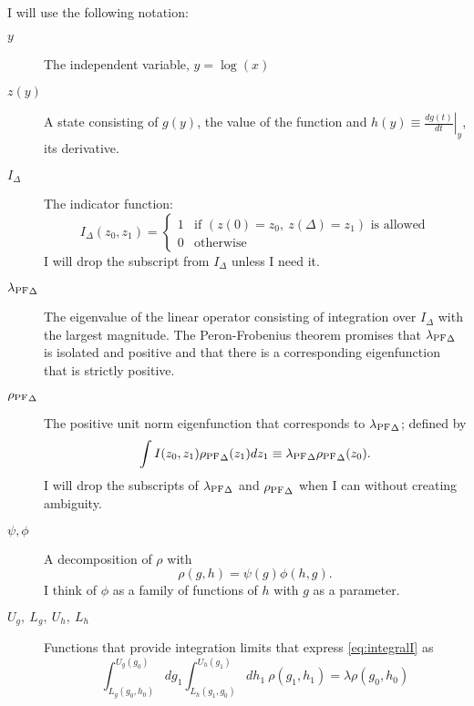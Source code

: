 \documentclass[]{article}
\newcommand\lambdaPF{\lambda_{\rm{PF}}} %
\newcommand\rhoPF{\rho_{\rm{PF}}} %
\begin{document}
I will use the following notation:
\begin{description}
\item[$y$] The independent variable, $y = \log(x)$
\item[$z(y)$] A state consisting of $g(y)$, the value of the function
  and $h(y) \equiv \left. \frac{d g(t)}{d t} \right|_y$, its derivative.
\item[$I_\Delta$] The indicator function:
  \begin{equation}
    \label{eq:indicator}
    I_\Delta(z_0, z_1) =
    \begin{cases}
      1 & \text{if } \left( z(0) = z_0,~z(\Delta)=z_1
      \right) \text{ is allowed} \\
      0 & \text{otherwise}
    \end{cases}
  \end{equation}
  I will drop the subscript from $I_\Delta$ unless I need it.
\item[${\lambdaPF}_\Delta$] The eigenvalue of the linear operator
  consisting of integration over $I_\Delta$ with the largest
  magnitude.  The Peron-Frobenius theorem promises that
  ${\lambdaPF}_\Delta$ is isolated and positive and that there is a
  corresponding eigenfunction that is strictly positive.
\item[${\rhoPF}_\Delta$] The positive unit norm eigenfunction that
  corresponds to ${\lambdaPF}_\Delta$; defined by
  \begin{equation}
    \label{eq:integralI}
    \int I(z_0, z_1) {\rhoPF}_\Delta(z_1) d z_1 \equiv {\lambdaPF}_\Delta
    {\rhoPF}_\Delta(z_0).
  \end{equation}
  I will drop the subscripts of ${\lambdaPF}_\Delta$ and
  ${\rhoPF}_\Delta$ when I can without creating ambiguity.
\item[$\psi, \phi$] A decomposition of $\rho$ with
  \begin{equation*}
    \rho(g,h) = \psi(g) \phi(h,g).
  \end{equation*}
  I think of $\phi$ as a family of functions of $h$ with $g$ as a
  parameter.
\item[$U_g,~L_g,~U_h,~L_h$] Functions that provide integration limits
  that express \eqref{eq:integralI} as
  \begin{equation}
    \label{eq:integralUL_}
    \int_{L_g(g_0,h_0)}^{U_g(g_0)} dg_1
    \int_{L_h(g_1,g_0)}^{U_h(g_1)} dh_1~ \rho(g_1, h_1) = \lambda
    \rho(g_0, h_0)
  \end{equation}
\end{description}
\end{document}
